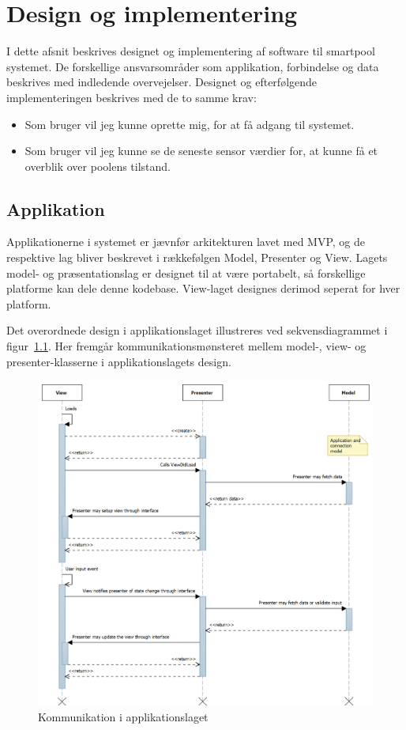 \chapter{Design og implementering}\label{cha:design}
I dette afsnit beskrives designet og implementering af software til \gls{smartpool} systemet. De forskellige ansvarsområder som applikation, forbindelse og data beskrives med indledende overvejelser. 
Designet og efterfølgende implementeringen beskrives med de to samme krav: 

\begin{itemize}
	\item Som bruger vil jeg kunne oprette mig, for at få adgang til systemet.
	\item Som bruger vil jeg kunne se de seneste sensor værdier for, at kunne få et overblik over poolens tilstand.
\end{itemize}

\section{Applikation}
Applikationerne i systemet er jævnfør arkitekturen lavet med MVP, og de respektive lag bliver beskrevet i rækkefølgen Model, Presenter og View. Lagets model- og præsentationslag er designet til at være portabelt, så forskellige platforme kan dele denne kodebase. View-laget designes derimod seperat for hver platform. 

Det overordnede design i applikationslaget illustreres ved sekvensdiagrammet i figur~\ref{fig:application_sd}. Her fremgår kommunikationsmønsteret mellem model-, view- og presenter-klasserne i applikationslagets design.

\begin{figure}
	\centering
	\includegraphics[width=1.0\linewidth]{figs/design/application_sd}
	\caption{Kommunikation i applikationslaget}
	\label{fig:application_sd}
\end{figure}

